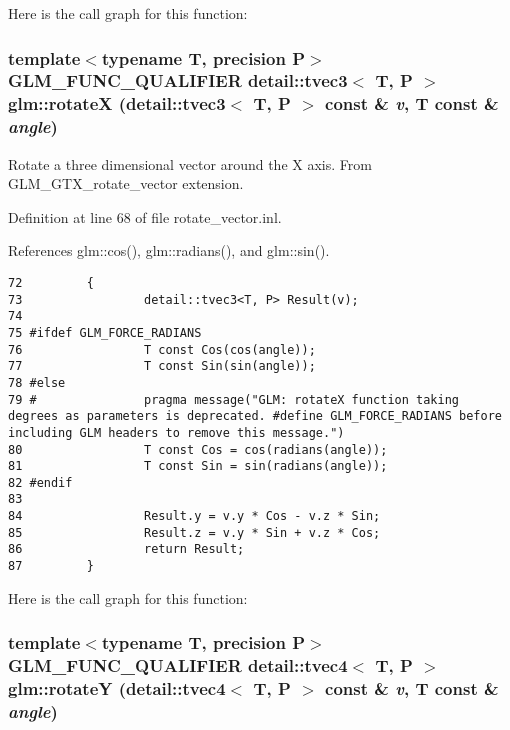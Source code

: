 Here is the call graph for this function:\hypertarget{group__gtx__rotate__vector_g29ccc284b661dc52c457959f8cbf8af6}{
\subsubsection[rotateX]{\setlength{\rightskip}{0pt plus 5cm}template$<$typename T, precision P$>$ GLM\_\-FUNC\_\-QUALIFIER detail::tvec3$<$ T, P $>$ glm::rotateX (detail::tvec3$<$ T, P $>$ const \& {\em v}, \/  T const \& {\em angle})}}
\label{group__gtx__rotate__vector_g29ccc284b661dc52c457959f8cbf8af6}


Rotate a three dimensional vector around the X axis. From GLM\_\-GTX\_\-rotate\_\-vector extension. 

Definition at line 68 of file rotate\_\-vector.inl.

References glm::cos(), glm::radians(), and glm::sin().

\begin{Code}\begin{verbatim}72         {
73                 detail::tvec3<T, P> Result(v);
74 
75 #ifdef GLM_FORCE_RADIANS
76                 T const Cos(cos(angle));
77                 T const Sin(sin(angle));
78 #else
79 #               pragma message("GLM: rotateX function taking degrees as parameters is deprecated. #define GLM_FORCE_RADIANS before including GLM headers to remove this message.")
80                 T const Cos = cos(radians(angle));
81                 T const Sin = sin(radians(angle));
82 #endif
83 
84                 Result.y = v.y * Cos - v.z * Sin;
85                 Result.z = v.y * Sin + v.z * Cos;
86                 return Result;
87         }
\end{verbatim}
\end{Code}




Here is the call graph for this function:\hypertarget{group__gtx__rotate__vector_g8e90d477a21ac9e17a8b764eac6d0999}{
\subsubsection[rotateY]{\setlength{\rightskip}{0pt plus 5cm}template$<$typename T, precision P$>$ GLM\_\-FUNC\_\-QUALIFIER detail::tvec4$<$ T, P $>$ glm::rotateY (detail::tvec4$<$ T, P $>$ const \& {\em v}, \/  T const \& {\em angle})}}
\label{group__gtx__rotate__vector_g8e90d477a21ac9e17a8b764eac6d0999}


